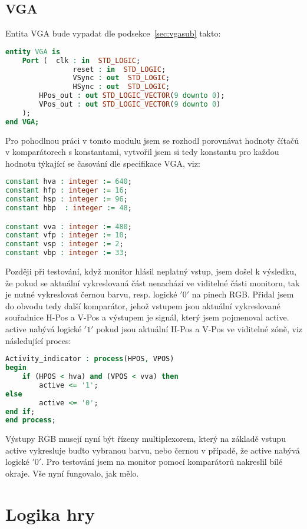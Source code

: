 \documentclass{report}
\begin{document}
\subsection{VGA}\label{sec:vgaimplement}
Entita VGA bude vypadat dle podsekce~\ref{sec:vgasub} takto:
\begin{lstlisting}[language=VHDL]
entity VGA is
    Port (	clk : in  STD_LOGIC;
            	reset : in  STD_LOGIC;
            	VSync : out  STD_LOGIC;
            	HSync : out  STD_LOGIC;
	  	HPos_out : out STD_LOGIC_VECTOR(9 downto 0);
	  	VPos_out : out STD_LOGIC_VECTOR(9 downto 0)
	);
end VGA;
\end{lstlisting}
Pro pohodlnou práci v tomto modulu jsem se rozhodl porovnávat hodnoty čítačů v komparátorech s konstantami, vytvořil jsem si tedy konstantu pro každou hodnotu týkající se časování dle specifikace VGA, viz:
\begin{lstlisting}[language=VHDL]
constant hva : integer := 640;
constant hfp : integer := 16;
constant hsp : integer := 96;
constant hbp  : integer := 48;

constant vva : integer := 480;
constant vfp : integer := 10;
constant vsp : integer := 2;
constant vbp : integer := 33;
\end{lstlisting}
Později při testování, když monitor hlásil neplatný vstup, jsem došel k výsledku, že pokud se aktuální vykreslovaná část nenachází ve viditelné části monitoru, tak je nutné vykreslovat černou barvu, resp. logické $'0'$ na pinech RGB. Přidal jsem do obvodu tedy další komparátor, jehož vstupem jsou aktuální vykreslované souřadnice H-Pos a V-Pos a výstupem je signál, který jsem pojmenoval active. active nabývá logické $'1'$ pokud jsou aktuální H-Pos a V-Pos ve viditelné zóně, viz následující proces:
\begin{lstlisting}[language=VHDL]
Activity_indicator : process(HPOS, VPOS)
begin
	if (HPOS < hva) and (VPOS < vva) then
		active <= '1';
else
		active <= '0'; 
end if;
end process;
\end{lstlisting}
Výstupy RGB musejí nyní být řízeny multiplexorem, který na základě vstupu active vykresluje buďto vybranou barvu, nebo černou v případě, že active nabývá logické $'0'$. Pro testování jsem na monitor pomocí komparátorů nakreslil bílé okraje. Vše nyní fungovalo, jak mělo.
\section{Logika hry}
\end{document}
